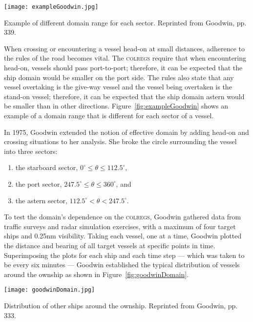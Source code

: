 \documentclass[twoside,symmetric,notoc]{tufte-book}
\begin{document}
\begin{marginfigure}
	\texttt{[image: exampleGoodwin.jpg]}
	\caption[Example of different domain range for each sector.]{Example of different domain range for each sector. Reprinted from Goodwin, pp. 339.}
	\label{fig:exampleGoodwin}
\end{marginfigure}
\par{%
When crossing or encountering a vessel head-on at small distances, adherence to the rules of the road becomes vital. The \textsc{colregs} require that when encountering head-on, vessels should pass port-to-port; therefore, it can be expected that the ship domain would be smaller on the port side. The rules also state that any vessel overtaking is the give-way vessel and the vessel being overtaken is the stand-on vessel; therefore, it can be expected that the ship domain astern would be smaller than in other directions.\cite{USCG} Figure~\ref{fig:exampleGoodwin} shows an example of a domain range that is different for each sector of a vessel.
}
\par{%
In 1975, Goodwin\cite{Goodwin} extended the notion of effective domain by adding head-on and crossing situations to her analysis. She broke the circle surrounding the vessel into three sectors: 
\newpage
\begin{enumerate}
    \item the starboard sector, $0^{\circ}  \leq \theta \leq 112.5^{\circ}$,
    \item the port sector, $247.5^{\circ}  \leq \theta \leq 360^{\circ}$, and
    \item the astern sector, $112.5^{\circ}  < \theta < 247.5^{\circ}$.
\end{enumerate}
To test the domain's dependence on the \textsc{colregs}, Goodwin gathered data from traffic surveys and radar simulation exercises, with a maximum of four target ships and 0.25nm visibility. Taking each vessel, one at a time, Goodwin plotted the distance and bearing of all target vessels at specific points in time. Superimposing the plots for each ship and each time step --- which was taken to be every six minutes --- Goodwin established the typical distribution of vessels around the ownship as shown in Figure~\ref{fig:goodwinDomain}.
} \begin{marginfigure}
	\texttt{[image: goodwinDomain.jpg]}
	\caption[Distribution of other ships around the ownship.]{Distribution of other ships around the ownship. Reprinted from Goodwin, pp. 333.}
	\label{fig:goodwinDomain}
\end{marginfigure}
\end{document}

